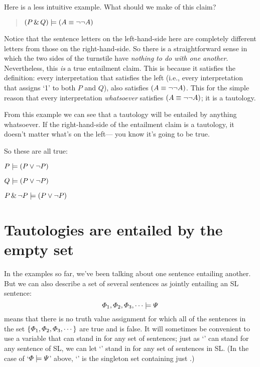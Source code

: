 Here is a less intuitive example. What should we make of this claim?

\begin{quote}
$(P\,\&\, Q) \models (A\equiv\neg\neg A)$
\end{quote}

Notice that the sentence letters on the left-hand-side here are completely different letters from those on the right-hand-side. So there is a straightforward sense in which the two sides of the turnstile have \emph{nothing to do with one another}. Nevertheless, this \emph{is} a true entailment claim. This is because it satisfies the definition: every interpretation that satisfies the left (i.e., every interpretation that assigns `1' to both $P$ and $Q$), also satisfies $(A\equiv\neg\neg A)$. This for the simple reason that every interpretation \emph{whatsoever} satisfies $(A\equiv\neg\neg A)$; it is a tautology.

From this example we can see that a tautology will be entailed by anything whatsoever. If the right-hand-side of the entailment claim is a tautology, it doesn't matter what's on the left--- you know it's going to be true.

So these are all true:

\begin{earg}
\item[] $P \models (P \vee \neg P)$
\item[] $Q \models (P \vee \neg P)$
\item[] $P \,\&\, \neg P \models (P \vee \neg P)$
\end{earg}

\section{Tautologies are entailed by the empty set}

In the examples so far, we've been talking about one sentence entailing another. But we can also describe a set of several sentences as jointly entailing an SL sentence: $$\varPhi{}_1,\varPhi{}_2,\varPhi{}_3,\cdots\models\varPsi{}$$ means that there is no truth value assignment for which all of the sentences in the set $\{\varPhi{}_1,\varPhi{}_2,\varPhi{}_3,\cdots\}$ are true and \metaB{} is false. It will sometimes be convenient to use a variable that can stand in for any set of sentences; just as `\metaA{}' can stand for any sentence of SL, we can let `\metaSetX{}' stand in for any set of sentences in SL. (In the case of `$\varPhi{}\models\varPsi{}$' above, `\metaSetX{}' is the singleton set containing just \metaA{}.)

